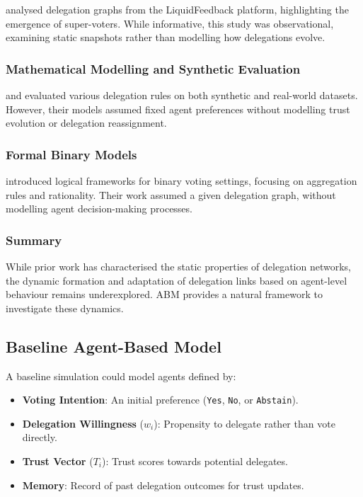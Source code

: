\citet{kling2015votingbehaviourpoweronline} analysed delegation graphs from the LiquidFeedback platform, highlighting the emergence of super-voters. While informative, this study was observational, examining static snapshots rather than modelling how delegations evolve.

\subsubsection{Mathematical Modelling and Synthetic Evaluation}

\citet{brill_liquid_2021} and evaluated various delegation rules on both synthetic and real-world datasets. However, their models assumed fixed agent preferences without modelling trust evolution or delegation reassignment.

\subsubsection{Formal Binary Models}

\citet{christoffBinaryVotingDelegable2017} introduced logical frameworks for binary voting settings, focusing on aggregation rules and rationality. Their work assumed a given delegation graph, without modelling agent decision-making processes.

\subsubsection{Summary}

While prior work has characterised the static properties of delegation networks, the dynamic formation and adaptation of delegation links based on agent-level behaviour remains underexplored. ABM provides a natural framework to investigate these dynamics.

\subsection{Baseline Agent-Based Model}

A baseline simulation could model agents defined by:

\begin{itemize}
    \item \textbf{Voting Intention}: An initial preference (\texttt{Yes}, \texttt{No}, or \texttt{Abstain}).
    \item \textbf{Delegation Willingness} ($w_i$): Propensity to delegate rather than vote directly.
    \item \textbf{Trust Vector} ($T_i$): Trust scores towards potential delegates.
    \item \textbf{Memory}: Record of past delegation outcomes for trust updates.
\end{itemize}

